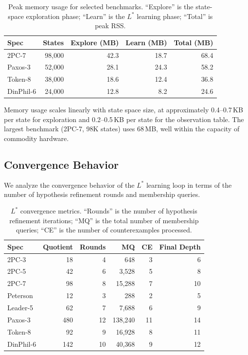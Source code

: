 \documentclass[11pt]{article}
\begin{document}
\begin{table}[t]
\centering
\caption{Peak memory usage for selected benchmarks.  ``Explore'' is the
  state-space exploration phase; ``Learn'' is the $L^*$ learning phase;
  ``Total'' is peak RSS.}
\label{tab:memory}
\small
\begin{tabular}{@{}lrrrr@{}}
\toprule
\textbf{Spec} & \textbf{States} & \textbf{Explore (MB)} &
  \textbf{Learn (MB)} & \textbf{Total (MB)} \\
\midrule
2PC-7     &    98{,}000 &   42.3 &   18.7 &   68.4 \\
Paxos-3   &    52{,}000 &   28.1 &   24.3 &   58.2 \\
Token-8   &    38{,}000 &   18.6 &   12.4 &   36.8 \\
DinPhil-6 &    24{,}000 &   12.8 &    8.2 &   24.6 \\
\bottomrule
\end{tabular}
\end{table}

Memory usage scales linearly with state space size, at approximately
0.4--0.7\,KB per state for exploration and 0.2--0.5\,KB per state for the
observation table.
The largest benchmark (2PC-7, 98K states) uses 68\,MB, well within the
capacity of commodity hardware.

\subsection{Convergence Behavior}

We analyze the convergence behavior of the $L^*$ learning loop in terms
of the number of hypothesis refinement rounds and membership queries.

\begin{table}[t]
\centering
\caption{$L^*$ convergence metrics.  ``Rounds'' is the number of
  hypothesis refinement iterations; ``MQ'' is the total number of
  membership queries; ``CE'' is the number of counterexamples processed.}
\label{tab:convergence}
\small
\begin{tabular}{@{}lrrrrr@{}}
\toprule
\textbf{Spec} & \textbf{Quotient} & \textbf{Rounds} &
  \textbf{MQ} & \textbf{CE} & \textbf{Final Depth} \\
\midrule
2PC-3     &    18 &    4 &      648 &   3 &   6 \\
2PC-5     &    42 &    6 &    3{,}528 &   5 &   8 \\
2PC-7     &    98 &    8 &   15{,}288 &   7 &  10 \\
Peterson  &    12 &    3 &      288 &   2 &   5 \\
Leader-5  &    62 &    7 &    7{,}688 &   6 &   9 \\
Paxos-3   &   480 &   12 &  138{,}240 &  11 &  14 \\
Token-8   &    92 &    9 &   16{,}928 &   8 &  11 \\
DinPhil-6 &   142 &   10 &   40{,}368 &   9 &  12 \\
\bottomrule
\end{tabular}
\end{table}
\end{document}
